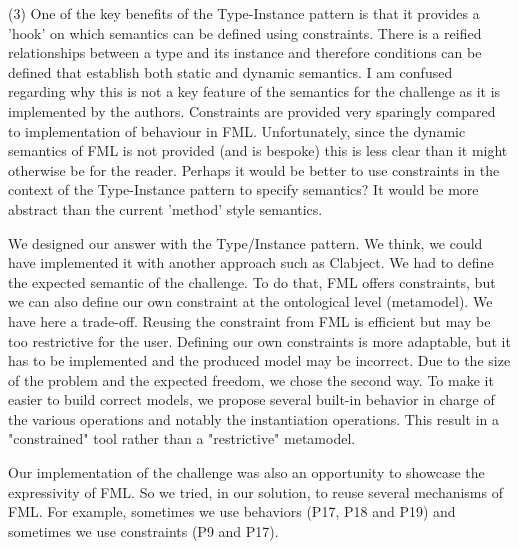 \documentclass[10pt]{article}
\begin{document}
\begin{response}{(3) One of the key benefits of the Type-Instance pattern is that it provides a 'hook' on which semantics can be defined using constraints. There is a reified relationships between a type and its instance and therefore conditions can be defined that establish both static and dynamic semantics. I am confused regarding why this is not a key feature of the semantics for the challenge as it is implemented by the authors. Constraints are provided very sparingly compared to implementation of behaviour in FML. Unfortunately, since the dynamic semantics of FML is not provided (and is bespoke) this is less clear than it might otherwise be for the reader. Perhaps it would be better to use constraints in the context of the Type-Instance pattern to specify semantics? It would be more abstract than the current 'method' style semantics.}

We designed our answer with the Type/Instance pattern. We think, we could have implemented it with another approach such as Clabject.
We had to define the expected semantic of the challenge. To do that, FML offers constraints, but we can also define our own constraint at the ontological level (metamodel). We have here a trade-off. Reusing the constraint from FML is efficient but may be too restrictive for the user. Defining our own constraints is more adaptable, but it has to be implemented and the produced model may be incorrect. Due to the size of the problem and the expected freedom, we chose the second way. To make it easier to build correct models, we propose several built-in behavior in charge of the various operations and notably the instantiation operations. This result in a "constrained" tool rather than a "restrictive" metamodel.

Our implementation of the challenge was also an opportunity to showcase the expressivity of FML. So we tried, in our solution, to reuse several mechanisms of FML. For example, sometimes we use behaviors (P17, P18 and P19) and sometimes we use constraints (P9 and P17).%




\end{response}
\end{document}
